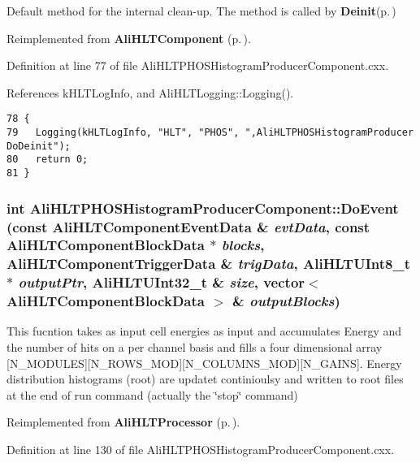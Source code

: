 Default method for the internal clean-up. The method is called by {\bf Deinit}{\rm (p.\,\pageref{classAliHLTPHOSHistogramProducerComponent_a5})} 

Reimplemented from {\bf Ali\-HLTComponent} {\rm (p.\,\pageref{classAliHLTComponent_b6})}.

Definition at line 77 of file Ali\-HLTPHOSHistogram\-Producer\-Component.cxx.

References k\-HLTLog\-Info, and Ali\-HLTLogging::Logging().

\footnotesize\begin{verbatim}78 {
79   Logging(kHLTLogInfo, "HLT", "PHOS", ",AliHLTPHOSHistogramProducer DoDeinit");
80   return 0;
81 }
\end{verbatim}\normalsize 


\subsubsection{\setlength{\rightskip}{0pt plus 5cm}int Ali\-HLTPHOSHistogram\-Producer\-Component::Do\-Event (const {\bf Ali\-HLTComponent\-Event\-Data} \& {\em evt\-Data}, const {\bf Ali\-HLTComponent\-Block\-Data} $\ast$ {\em blocks}, {\bf Ali\-HLTComponent\-Trigger\-Data} \& {\em trig\-Data}, {\bf Ali\-HLTUInt8\_\-t} $\ast$ {\em output\-Ptr}, {\bf Ali\-HLTUInt32\_\-t} \& {\em size}, vector$<$ {\bf Ali\-HLTComponent\-Block\-Data} $>$ \& {\em output\-Blocks})\hspace{0.3cm}{\tt  [virtual]}}\label{classAliHLTPHOSHistogramProducerComponent_a7}


This fucntion takes as input cell energies as input and accumulates Energy and the number of hits on a per channel basis and fills a four dimensional array [N\_\-MODULES][N\_\-ROWS\_\-MOD][N\_\-COLUMNS\_\-MOD][N\_\-GAINS]. Energy distribution histograms (root) are updatet continioulsy and written to root files at the end of run command (actually the \char`\"{}stop\char`\"{} command) 

Reimplemented from {\bf Ali\-HLTProcessor} {\rm (p.\,\pageref{classAliHLTProcessor_d0})}.

Definition at line 130 of file Ali\-HLTPHOSHistogram\-Producer\-Component.cxx.

